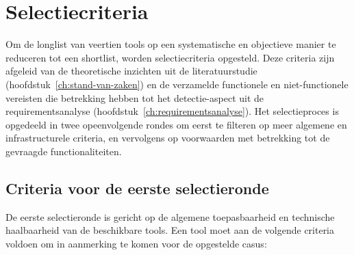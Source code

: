 \section{Selectiecriteria}
\label{sec:selectiecriteria}

\vspace{1em}

Om de longlist van veertien tools op een systematische en objectieve manier te reduceren tot een shortlist, worden selectiecriteria opgesteld. Deze criteria zijn afgeleid van de theoretische inzichten uit de literatuurstudie (hoofdstuk~\ref{ch:stand-van-zaken}) en de verzamelde functionele en niet-functionele vereisten die betrekking hebben tot het detectie-aspect uit de requirementsanalyse (hoofdstuk~\ref{ch:requirementsanalyse}). Het selectieproces is opgedeeld in twee opeenvolgende rondes om eerst te filteren op meer algemene en infrastructurele criteria, en vervolgens op voorwaarden met betrekking tot de gevraagde functionaliteiten.

\vspace{1em}

\subsection{Criteria voor de eerste selectieronde}

\vspace{1em}

De eerste selectieronde is gericht op de algemene toepasbaarheid en technische haalbaarheid van de beschikbare tools. Een tool moet aan de volgende criteria voldoen om in aanmerking te komen voor de opgestelde casus:

